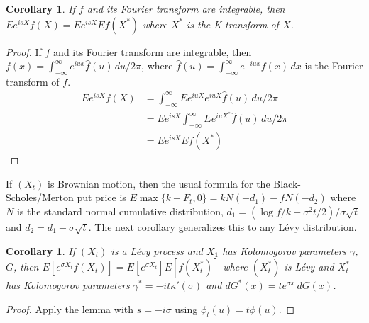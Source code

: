 \documentclass[fleqn]{amsart}
\newtheorem{corollary}[theorem]{Corollary}
\begin{document}
\begin{corollary}
If \(f\) and its Fourier transform are integrable, then
\(Ee^{isX}f(X) = Ee^{isX} Ef(X^*)\) where \(X^*\) is the
K-transform of \(X\).
\end{corollary}
\begin{proof}
If \(f\) and its Fourier transform are integrable, then
\(f(x) = \int_{-\infty}^\infty e^{iux}\hat{f}(u)\,du/2\pi\), where
\(\hat{f}(u) = \int_{-\infty}^\infty e^{-iux}f(x)\,dx\) is the
Fourier transform of \(f\).
\begin{align*}
E e^{isX}f(X) &= \int_{-\infty}^\infty E e^{iuX}e^{iuX} \hat{f}(u)\,du/2\pi\\
	&= Ee^{isX}\int_{-\infty}^\infty E e^{iuX^*} \hat{f}(u)\,du/2\pi\\
	&= Ee^{isX} E f(X^*)
\end{align*}
\end{proof}

If \((X_t)\) is Brownian motion, then the usual formula for the
Black-Scholes/Merton put price is \(E\max\{k - F_t, 0\}
= kN(-d_1) - fN(-d_2)\) where \(N\) is the standard normal
cumulative distribution, \(d_1 = (\log f/k + \sigma^2t/2)/\sigma\sqrt{t}\)
and \(d_2 = d_1 - \sigma\sqrt{t}\).
The next corollary generalizes this
to any L\'evy distribution.

\begin{corollary}
If \((X_t)\) is a L\'evy process and \(X_1\) has Kolomogorov
parameters \(\gamma\), \(G\),
then \(E[e^{\sigma X_t}f(X_t)] = E[e^{\sigma X_t}] E[f(X_t^*)]\) where
\((X_t^*)\) is L\'evy and \(X_t^*\) has Kolomogorov
parameters \(\gamma^* = -it\kappa'(\sigma)\)
and \(dG^*(x) = te^{\sigma x}\,dG(x)\).
\end{corollary}
\begin{proof}
Apply the lemma with \(s = -i\sigma\) using \(\phi_t(u) = t\phi(u)\).
\end{proof}

\end{document}
